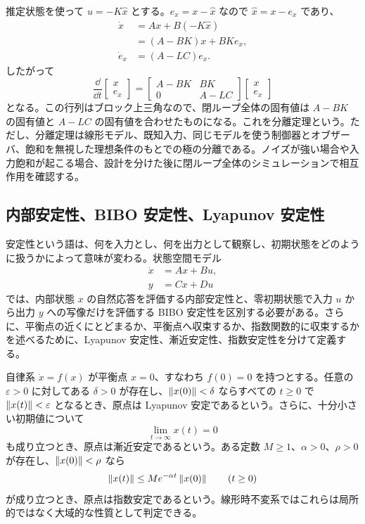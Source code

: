 推定状態を使って $u=-K\hat{x}$ とする。$e_x=x-\hat{x}$ なので $\hat{x}=x-e_x$ であり、
\begin{align}
  \dot{x}
  &=Ax+B(-K\hat{x})\\
  &=(A-BK)x+BK e_x,\\
  \dot{e}_x&=(A-LC)e_x.
\end{align}
したがって
\begin{equation}
  \frac{\dd}{\dd t}
  \begin{bmatrix}x\\e_x\end{bmatrix}
  =
  \begin{bmatrix}
    A-BK&BK\\
    0&A-LC
  \end{bmatrix}
  \begin{bmatrix}x\\e_x\end{bmatrix}
\end{equation}
となる。この行列はブロック上三角なので、閉ループ全体の固有値は $A-BK$ の固有値と $A-LC$ の固有値を合わせたものになる。これを分離定理という。ただし、分離定理は線形モデル、既知入力、同じモデルを使う制御器とオブザーバ、飽和を無視した理想条件のもとでの極の分離である。ノイズが強い場合や入力飽和が起こる場合、設計を分けた後に閉ループ全体のシミュレーションで相互作用を確認する。

\subsection{内部安定性、BIBO 安定性、Lyapunov 安定性}

安定性という語は、何を入力とし、何を出力として観察し、初期状態をどのように扱うかによって意味が変わる。状態空間モデル
\begin{align}
  \dot{x}&=Ax+Bu,\\
  y&=Cx+Du
  \label{eq:stability-ss-model}
\end{align}
では、内部状態 $x$ の自然応答を評価する内部安定性と、零初期状態で入力 $u$ から出力 $y$ への写像だけを評価する BIBO 安定性を区別する必要がある。さらに、平衡点の近くにとどまるか、平衡点へ収束するか、指数関数的に収束するかを述べるために、Lyapunov 安定性、漸近安定性、指数安定性を分けて定義する。

\begin{definition}
自律系 $\dot{x}=f(x)$ が平衡点 $x=0$、すなわち $f(0)=0$ を持つとする。任意の $\varepsilon>0$ に対してある $\delta>0$ が存在し、$\left\|x(0)\right\|<\delta$ ならすべての $t\ge0$ で $\left\|x(t)\right\|<\varepsilon$ となるとき、原点は Lyapunov 安定であるという。さらに、十分小さい初期値について
\begin{equation}
  \lim_{t\to\infty}x(t)=0
\end{equation}
も成り立つとき、原点は漸近安定であるという。ある定数 $M\ge1$、$\alpha>0$、$\rho>0$ が存在し、$\left\|x(0)\right\|<\rho$ なら
\begin{equation}
  \left\|x(t)\right\|\le M e^{-\alpha t}\left\|x(0)\right\|
  \qquad (t\ge0)
  \label{eq:exponential-stability}
\end{equation}
が成り立つとき、原点は指数安定であるという。線形時不変系ではこれらは局所的ではなく大域的な性質として判定できる。
\end{definition}

